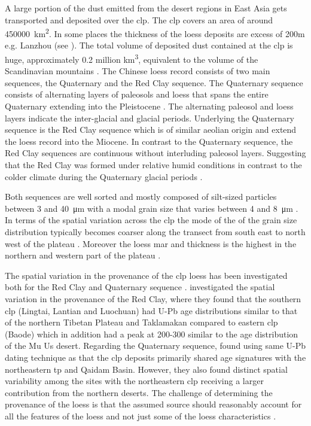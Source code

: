A large portion of the dust emitted from the desert regions in East Asia gets transported and deposited over the \acrshort{clp}. 
The \acrshort{clp} covers an area of around \SI{450000}{\square\km}. In some places the thickness of the loess deposits are excess of 200m e.g. Lanzhou (see ). 
The total volume of deposited dust contained at the \acrshort{clp} is huge, approximately 0.2 million \si{\cubic\km}, equivalent to the volume of the Scandinavian mountains \parencite{maher2016palaeoclimatic}.  
The Chinese loess record consists of two main sequences, the Quaternary and the Red Clay sequence. The Quaternary sequence consists of alternating layers of paleosols and loess that spans the entire Quaternary extending into the Pleistocene \parencite{maher2016palaeoclimatic}. 
The alternating paleosol and loess layers indicate the inter-glacial and glacial periods.  Underlying the Quaternary sequence is the Red Clay sequence which is of similar aeolian origin and extend the loess record into the Miocene. 
In contrast to the Quaternary sequence, the Red Clay sequences are continuous without interluding paleosol layers. Suggesting that the Red Clay was formed under relative humid conditions in contrast to the colder climate during the Quaternary glacial periods \parencite{yang2004comparison}. 

Both sequences are well sorted and mostly composed of silt-sized particles between 3 and \SI{40}{\micro\metre} with a modal grain size that varies between 4 and \SI{8}{\micro\metre} \parencite{maher2016palaeoclimatic}.
In terms of the spatial variation across the \acrshort{clp} the mode of the of the grain size distribution typically becomes coarser along the transect from south east to north west of the plateau \parencite{ding2000re}. 
Moreover the loess \acrfull{mar} and thickness is the highest in the northern and western part of the plateau \parencite{maher2016palaeoclimatic}.    

The spatial variation in the provenance of the \acrshort{clp} loess has been investigated both for the  Red Clay  \parencite{shang2016variations} and Quaternary sequence \parencite{bird2015quaternary}. 
\textcite{shang2016variations} investigated the spatial variation in the provenance of the Red Clay, where they found that the southern \acrshort{clp}  (Lingtai, Lantian and Luochuan) had U-Pb age distributions similar to that of the northern Tibetan Plateau and Taklamakan compared to eastern \acrshort{clp} (Baode) which in addition had a peak at 200-300 similar to the age distribution of the Mu Us desert. 
Regarding the Quaternary sequence, \textcite{bird2015quaternary} found using same U-Pb dating technique as \textcite{shang2016variations} that the \acrshort{clp} deposits primarily shared age signatures with the northeastern \acrfull{tp} and Qaidam Basin.
However, they also found distinct spatial variability among the sites with the northeastern \acrshort{clp} receiving a larger contribution from the northern deserts.   
The challenge of determining the provenance of the loess is that the assumed source should reasonably account for all the features of the loess and not just some of the loess characteristics \parencite{maher2016palaeoclimatic}.

